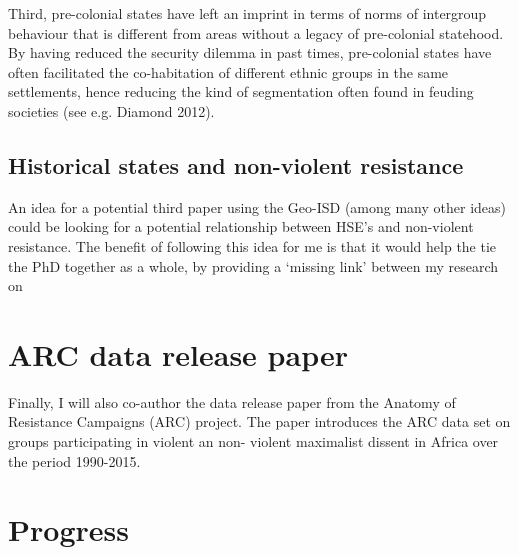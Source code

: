 \documentclass[12pt]{article}
\begin{document}
Third, pre-colonial states have left an imprint in terms of norms of intergroup
behaviour that is different from areas without a legacy of pre-colonial
statehood. By having reduced the security dilemma in past times, pre-colonial
states have often facilitated the co-habitation of different ethnic groups in
the same settlements, hence reducing the kind of segmentation often found in
feuding societies (see e.g. Diamond 2012).

\subsection{Historical states and non-violent resistance}

An idea for a potential third paper using the Geo-ISD (among many other ideas)
could be looking for a potential relationship between HSE's and non-violent
resistance. The benefit of following this idea for me is that it would help the
tie the PhD together as a whole, by providing a `missing link' between my
research on 

\section{ARC data release paper}

Finally, I will also co-author the data release paper from the Anatomy of 
Resistance Campaigns (ARC) project.
The paper introduces the ARC data set on groups participating in violent an non-
violent maximalist dissent in Africa over the period 1990-2015.




\section{Progress}
\end{document}
